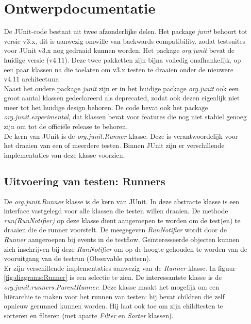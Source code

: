 \documentclass[i1]{oss}
\begin{document}
\section{Ontwerpdocumentatie}

De JUnit-code bestaat uit twee afzonderlijke delen. Het package \emph{junit} behoort tot versie v3.x, dit is aanwezig omwille van backwards compatibility, zodat testsuites voor JUnit v3.x nog gedraaid kunnen worden. Het package \emph{org.junit} bevat de huidige versie (v4.11). Deze twee pakketten zijn bijna volledig onafhankelijk, op een paar klassen na die toelaten om v3.x testen te draaien onder de nieuwere v4.11 architectuur.\\

Naast het oudere package \emph{junit} zijn er in het huidige package \emph{org.junit} ook een groot aantal klassen gedeclareerd als deprecated, zodat ook dezen eigenlijk niet meer tot het huidige design behoren. De code bevat ook het package \emph{org.junit.experimental}, dat klassen bevat voor features die nog niet stabiel genoeg zijn om tot de offici\"ele release te behoren.\\

De kern van JUnit is de \emph{org.junit.Runner} klasse. Deze is verantwoordelijk voor het draaien van een of meerdere testen. Binnen JUnit zijn er verschillende implementaties van deze klasse voorzien. \\

\subsection{Uitvoering van testen: Runners}

De \emph{org.junit.Runner} klasse is de kern van JUnit. In deze abstracte klasse is een interface vastgelegd voor alle klassen die testen willen draaien. De methode \emph{run(RunNotifier)} op deze klasse dient aangeroepen te worden om de test(en) te draaien die de runner voorstelt. De meegegeven \emph{RunNotifier} wordt door de \emph{Runner} aangeroepen bij events in de testflow. Ge\"interesseerde objecten kunnen zich inschrijven bij deze \emph{RunNotifier} om op de hoogte gehouden te worden van de vooruitgang van de testrun (Observable pattern).\\

Er zijn verschillende implementaties aanwezig van de \emph{Runner} klasse. In figuur \ref{fig:diagrams:Runner} is een selectie te zien. De interessantste klasse is de \emph{org.junit.runners.ParentRunner}. Deze klasse maakt het mogelijk om een hi\"erarchie te maken voor het runnen van testen: hij bevat children die zelf opnieuw gerunned kunnen worden. Hij laat ook toe om zijn childtesten te sorteren en filteren (met aparte \emph{Filter} en \emph{Sorter} klassen).\\
\end{document}
